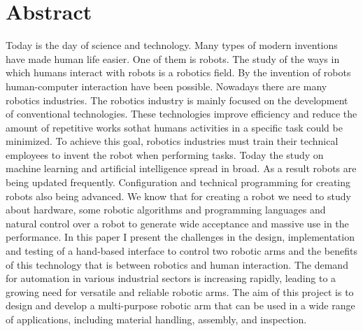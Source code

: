 \section{Abstract }
Today is the day of science and technology. Many types of modern inventions have made human life easier. One of them is robots. The study of the ways in which humans interact with robots is a robotics field. By the invention of robots human-computer interaction have been possible. Nowadays there are many robotics industries. The robotics industry is mainly focused on the development of conventional technologies. These technologies improve efficiency and reduce the amount of repetitive works sothat humans activities in a specific task could be minimized. To achieve this goal, robotics industries must train their technical employees to invent the robot when performing tasks. Today the study on machine learning and artificial intelligence spread in broad. As a result robots are being updated frequently. Configuration  and  technical  programming  for  creating robots also being advanced. We know that for creating a robot we need to study about hardware, some robotic algorithms and programming languages and natural control over a robot to generate wide acceptance and massive use in the performance. In this paper I present the challenges in the design, implementation and testing of a hand-based interface to control two robotic  arms and the benefits of this technology that is between robotics and human interaction. The demand for automation in various industrial sectors is increasing rapidly, leading to a growing need for versatile and reliable robotic arms. The aim of this project is to design and develop a multi-purpose robotic arm that can be used in a wide range of applications, including material handling, assembly, and inspection.
